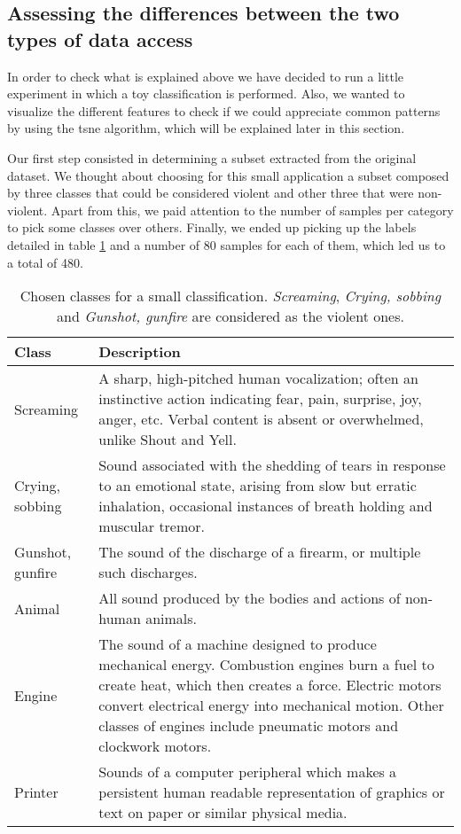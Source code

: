 	
\subsection{Assessing the differences between the two types of data access}

	In order to check what is explained above we have decided to run a little experiment in which a toy classification is performed. Also, we wanted to visualize the different features to check if we could appreciate common patterns by using the \acrfull{tsne} algorithm, which will be explained later in this section.
	
	Our first step consisted in determining a subset extracted from the original dataset. We thought about choosing for this small application a subset composed by three classes that could be considered violent and other three that were non-violent. Apart from this, we paid attention to the number of samples per category to pick some classes over others. Finally, we ended up picking up the labels detailed in table \ref{table:4} and a number of 80 samples for each of them, which led us to a total of 480.
	
	\begin{table}[h]
	\begin{center}
		\begin{tabular}{||m{7em} | m{23em} ||}
			\hline
			\textbf{Class} & \textbf{Description} \\
			\hline\hline
			Screaming & A sharp, high-pitched human vocalization; often an instinctive action indicating fear, pain, surprise, joy, anger, etc. Verbal content is absent or overwhelmed, unlike Shout and Yell. \\
			\hline
			Crying, sobbing & Sound associated with the shedding of tears in response to an emotional state, arising from slow but erratic inhalation, occasional instances of breath holding and muscular tremor. \\
			\hline
			Gunshot, gunfire & The sound of the discharge of a firearm, or multiple such discharges. \\
			\hline
			Animal & All sound produced by the bodies and actions of non-human animals. \\
			\hline
			Engine & The sound of a machine designed to produce mechanical energy. Combustion engines burn a fuel to create heat, which then creates a force. Electric motors convert electrical energy into mechanical motion. Other classes of engines include pneumatic motors and clockwork motors. \\
			\hline
			Printer & Sounds of a computer peripheral which makes a persistent human readable representation of graphics or text on paper or similar physical media. \\
			\hline
		\end{tabular}
	\end{center}
	\caption{Chosen classes for a small classification. \textit{Screaming}, \textit{Crying, sobbing} and \textit{Gunshot, gunfire} are considered as the violent ones.}
	\label{table:4}
	\end{table}
	
